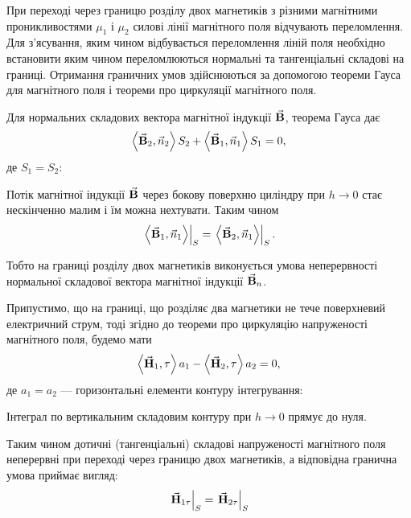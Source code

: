 При переході через границю розділу двох магнетиків з різними магнітними проникливостями $\mu_1$ і $\mu_2$ силові лінії магнітного поля відчувають переломлення. Для з'ясування, яким чином  відбувається переломлення ліній поля необхідно встановити яким чином переломлюються нормальні та тангенціальні складові на границі. Отримання граничних умов здійснюються за допомогою теореми Гауса для магнітного поля і теореми про циркуляції магнітного поля. \medskip

Для нормальних складових вектора магнітної індукції ${\vec{\mathbf{B}}}$, теорема Гауса дає
\begin{equation}
	\langle \vecf B_2, \vec n_2 \rangle S_2 + \langle \vecf B_1, \vec n_1 \rangle S_1 = 0,
\end{equation}
де $S_1 = S_2$:
\begin{figure}[H]
	\centering
\end{figure}

Потік магнітної індукції ${\vec{\mathbf{B}}}$ через бокову поверхню циліндру при $h \to 0$ стає нескінченно малим і їм можна нехтувати. Таким чином
\begin{equation}
	\left. \langle \vecf B_1, \vec n_1 \rangle \right|_S = \left. \langle \vecf B_2, \vec n_1 \rangle \right|_S.
\end{equation}

Тобто на границі розділу двох магнетиків виконується умова неперервності нормальної складової вектора магнітної індукції ${\vec{\mathbf{B}}}_n$. \medskip

Припустимо, що на границі, що розділяє два магнетики не тече поверхневий електричний струм, тоді згідно до теореми про циркуляцію напруженості магнітного поля, будемо мати
\begin{equation}
	\langle \vecf H_1, \tau \rangle a_1 - \langle \vecf H_2, \tau \rangle a_2 = 0,
\end{equation}
де $a_1 = a_2$ --- горизонтальні елементи контуру інтегрування:
\begin{figure}[H]
	\centering
\end{figure}

Інтеграл по вертикальним складовим контуру при $h \to 0$ прямує до нуля. \medskip

Таким чином дотичні (тангенціальні) складові напруженості магнітного поля неперервні при переході через границю двох магнетиків, а відповідна гранична умова приймає вигляд:
\begin{equation}
	\left. {\vec{\mathbf{H}}}_{1\tau} \right|_S = \left. {\vec{\mathbf{H}}}_{2\tau} \right|_S
\end{equation}


